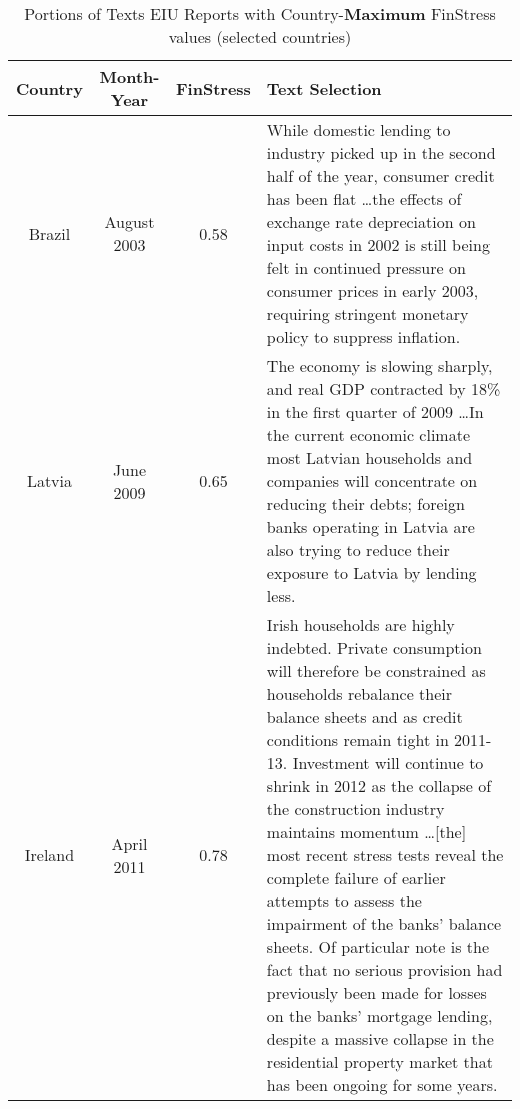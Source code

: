 \begin{table}
    \caption{Portions of Texts EIU Reports with Country-\textbf{Maximum} FinStress values (selected countries)}
    \label{text_selections_max}
    	\begin{center}
        \begin{tabular}{c c c | m{10cm}}
            \hline
            Country & Month-Year & FinStress & Text Selection \\
            \hline\hline
            Brazil & August 2003 & 0.58 & While domestic lending to industry picked up in the second half of the year, consumer credit has been flat \ldots the effects of exchange rate depreciation on input costs in 2002 is still being felt in continued pressure on consumer prices in early 2003, requiring stringent monetary policy to suppress inflation. \\[0.5cm]

            Latvia & June 2009 & 0.65 & The economy is slowing sharply, and real GDP contracted by 18\% in the first quarter of 2009 \ldots In the current economic climate most Latvian households and companies will concentrate on reducing their debts; foreign banks operating in Latvia are also trying to reduce their exposure to Latvia by lending less. \\[0.5cm]

            Ireland & April 2011 & 0.78 & Irish households are highly indebted. Private consumption will therefore be constrained as households rebalance their balance sheets and as credit conditions remain tight in 2011-13. Investment will continue to shrink in 2012 as the collapse of the construction industry maintains momentum \ldots [the] most recent stress tests reveal the complete failure of earlier attempts to assess the impairment of the banks' balance sheets. Of particular note is the fact that no serious provision had previously been made for losses on the banks' mortgage lending, despite a massive collapse in the residential property market that has been ongoing for some years. \\[0.5cm]


            \hline
    \end{tabular}
    \end{center}
\end{table}


